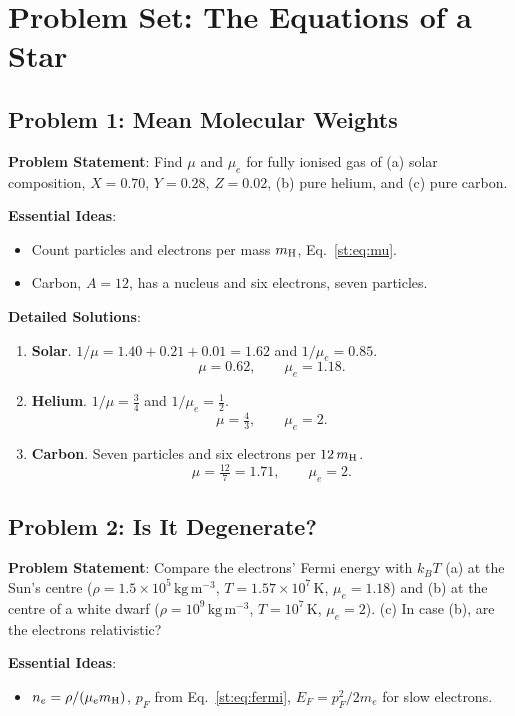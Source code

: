 \section{Problem Set: The Equations of a Star}


\subsection{Problem 1: Mean Molecular Weights}
\label{st:prob:mu}

\textbf{Problem Statement}: Find $\mu$ and $\mu_e$ for fully ionised gas of (a) solar composition, $X=0.70$, $Y=0.28$, $Z=0.02$, (b) pure helium, and (c) pure carbon.

\textbf{Essential Ideas}:
\begin{itemize}
	\item Count particles and electrons per mass $m_{\rm H}$, Eq.~\eqref{st:eq:mu}.
	\item Carbon, $A=12$, has a nucleus and six electrons, seven particles.
\end{itemize}

\textbf{Detailed Solutions}:
\begin{enumerate}[label=(\alph*)]
	\item \textbf{Solar}. $1/\mu=1.40+0.21+0.01=1.62$ and $1/\mu_e=0.85$.
	\[
	\boxed{\mu=0.62,\qquad\mu_e=1.18.}
	\]
	\item \textbf{Helium}. $1/\mu=\tfrac34$ and $1/\mu_e=\tfrac12$.
	\[
	\boxed{\mu=\tfrac43,\qquad\mu_e=2.}
	\]
	\item \textbf{Carbon}. Seven particles and six electrons per $12\,m_{\rm H}$.
	\[
	\boxed{\mu=\tfrac{12}{7}=1.71,\qquad\mu_e=2.}
	\]
\end{enumerate}

\subsection{Problem 2: Is It Degenerate?}
\label{st:prob:degeneracy}

\textbf{Problem Statement}: Compare the electrons' Fermi energy with $k_BT$ (a) at the Sun's centre ($\rho=1.5\times10^5\,\mathrm{kg\,m^{-3}}$, $T=1.57\times10^7\,\mathrm K$, $\mu_e=1.18$) and (b) at the centre of a white dwarf ($\rho=10^9\,\mathrm{kg\,m^{-3}}$, $T=10^7\,\mathrm K$, $\mu_e=2$). (c) In case (b), are the electrons relativistic?

\textbf{Essential Ideas}:
\begin{itemize}
	\item $n_e=\rho/(\mu_em_{\rm H})$, $p_F$ from Eq.~\eqref{st:eq:fermi}, $E_F=p_F^2/2m_e$ for slow electrons.
\end{itemize}


